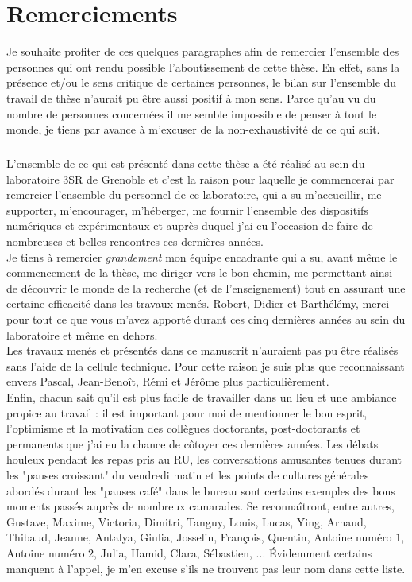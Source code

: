 \chapter*{Remerciements}

Je souhaite profiter de ces quelques paragraphes afin de remercier l'ensemble des personnes qui ont rendu possible l'aboutissement de cette thèse. En effet, sans la présence et/ou le sens critique de certaines personnes, le bilan sur l'ensemble du travail de thèse n'aurait pu être aussi positif à mon sens. Parce qu'au vu du nombre de personnes concernées il me semble impossible de penser à tout le monde, je tiens par avance à m'excuser de la non-exhaustivité de ce qui suit.

\paragraph*{}
L'ensemble de ce qui est présenté dans cette thèse a été réalisé au sein du laboratoire 3SR de Grenoble et c'est la raison pour laquelle je commencerai par remercier l'ensemble du personnel de ce laboratoire, qui a su m'accueillir, me supporter, m'encourager, m'héberger, me fournir l'ensemble des dispositifs numériques et expérimentaux et auprès duquel j'ai eu l'occasion de faire de nombreuses et belles rencontres ces dernières années.
\\Je tiens à remercier \emph{grandement} mon équipe encadrante qui a su, avant même le commencement de la thèse, me diriger vers le bon chemin, me permettant ainsi de découvrir le monde de la recherche (et de l'enseignement) tout en assurant une certaine efficacité dans les travaux menés. Robert, Didier et Barthélémy, merci pour tout ce que vous m'avez apporté durant ces cinq dernières années au sein du laboratoire et même en dehors.
\\Les travaux menés et présentés dans ce manuscrit n'auraient pas pu être réalisés sans l'aide de la cellule technique. Pour cette raison je suis plus que reconnaissant envers Pascal, Jean-Benoît, Rémi et Jérôme plus particulièrement.
\\Enfin, chacun sait qu'il est plus facile de travailler dans un lieu et une ambiance propice au travail : il est important pour moi de mentionner le bon esprit, l'optimisme et la motivation des collègues doctorants, post-doctorants et permanents que j'ai eu la chance de côtoyer ces dernières années. Les débats houleux pendant les repas pris au RU, les conversations amusantes tenues durant les "pauses croissant" du vendredi matin et les points de cultures générales abordés durant les "pauses café" dans le bureau sont certains exemples des bons moments passés auprès de nombreux camarades. Se reconnaîtront, entre autres, Gustave, Maxime, Victoria, Dimitri, Tanguy, Louis, Lucas, Ying, Arnaud, Thibaud, Jeanne, Antalya, Giulia, Josselin, François, Quentin, Antoine numéro $1$, Antoine numéro $2$, Julia, Hamid, Clara, Sébastien, ... \'Evidemment certains manquent à l'appel, je m'en excuse s'ils ne trouvent pas leur nom dans cette liste.

